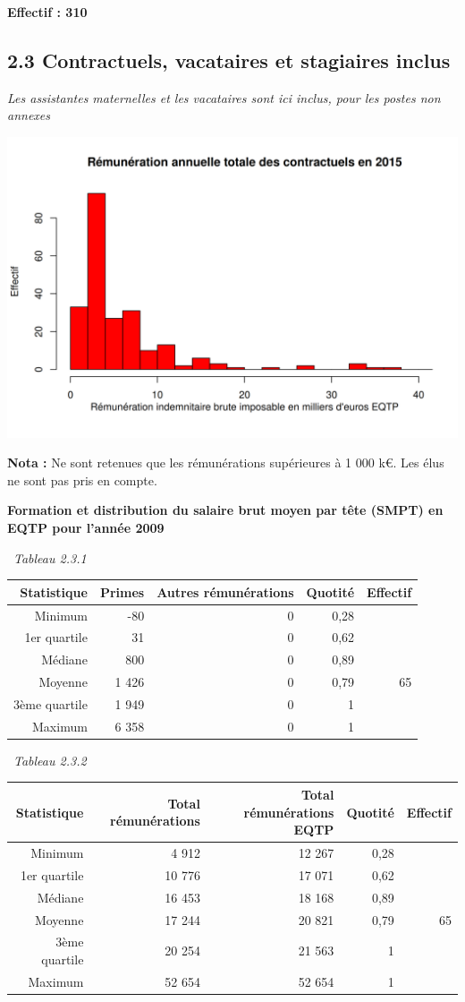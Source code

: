\textbf{Effectif : 310 }

\hypertarget{contractuels-vacataires-et-stagiaires-inclus}{%
\subsection{2.3 Contractuels, vacataires et stagiaires
inclus}\label{contractuels-vacataires-et-stagiaires-inclus}}

\emph{Les assistantes maternelles et les vacataires sont ici inclus,
pour les postes non annexes}

\includegraphics{altair_files/figure-latex/unnamed-chunk-61-1.png}

\textbf{Nota :} Ne sont retenues que les rémunérations supérieures à 1
000 k€. Les élus ne sont pas pris en compte.

\textbf{Formation et distribution du salaire brut moyen par tête (SMPT)
en EQTP pour l'année 2009 }

~\emph{Tableau 2.3.1}

\begin{longtable}[]{@{}rrrrr@{}}
\toprule
Statistique & Primes & Autres rémunérations & Quotité &
Effectif\tabularnewline
\midrule
\endhead
Minimum & -80 & 0 & 0,28 &\tabularnewline
1er quartile & 31 & 0 & 0,62 &\tabularnewline
Médiane & 800 & 0 & 0,89 &\tabularnewline
Moyenne & 1 426 & 0 & 0,79 & 65\tabularnewline
3ème quartile & 1 949 & 0 & 1 &\tabularnewline
Maximum & 6 358 & 0 & 1 &\tabularnewline
\bottomrule
\end{longtable}

~\emph{Tableau 2.3.2}

\begin{longtable}[]{@{}rrrrr@{}}
\toprule
Statistique & Total rémunérations & Total rémunérations EQTP & Quotité &
Effectif\tabularnewline
\midrule
\endhead
Minimum & 4 912 & 12 267 & 0,28 &\tabularnewline
1er quartile & 10 776 & 17 071 & 0,62 &\tabularnewline
Médiane & 16 453 & 18 168 & 0,89 &\tabularnewline
Moyenne & 17 244 & 20 821 & 0,79 & 65\tabularnewline
3ème quartile & 20 254 & 21 563 & 1 &\tabularnewline
Maximum & 52 654 & 52 654 & 1 &\tabularnewline
\bottomrule
\end{longtable}

